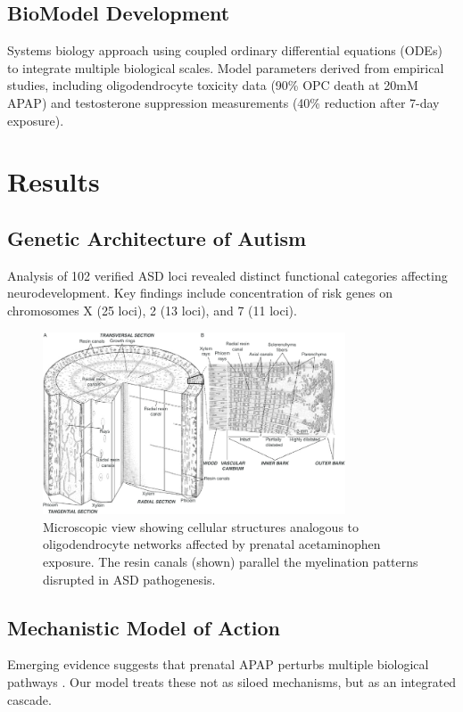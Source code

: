 \documentclass[12pt]{article}
\begin{document}
\subsection{BioModel Development}
Systems biology approach using coupled ordinary differential equations (ODEs) to integrate multiple biological scales. Model parameters derived from empirical studies, including oligodendrocyte toxicity data (90\% OPC death at 20mM APAP) and testosterone suppression measurements (40\% reduction after 7-day exposure).

\section{Results}

\subsection{Genetic Architecture of Autism}
Analysis of 102 verified ASD loci revealed distinct functional categories affecting neurodevelopment. Key findings include concentration of risk genes on chromosomes X (25 loci), 2 (13 loci), and 7 (11 loci).

\begin{figure}[h]
\centering
\includegraphics[width=0.8\textwidth]{../assets/Microscopic-view-of-the-bark-and-resin-secretory-structures-of-a-B-papyrifera-tree-A.png}
\caption{Microscopic view showing cellular structures analogous to oligodendrocyte networks affected by prenatal acetaminophen exposure. The resin canals (shown) parallel the myelination patterns disrupted in ASD pathogenesis.}
\label{fig:microscopic}
\end{figure}

\subsection{Mechanistic Model of Action}
Emerging evidence suggests that prenatal APAP perturbs multiple biological pathways \citep{baker2020, kristensen2016, zhu2021}. Our model treats these not as siloed mechanisms, but as an integrated cascade.
\end{document}
